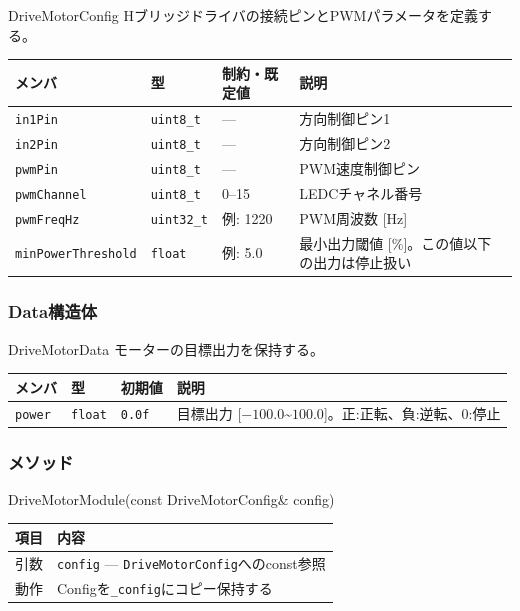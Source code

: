 \begin{funcblock}{DriveMotorConfig}
Hブリッジドライバの接続ピンとPWMパラメータを定義する。

\begin{longtable}{l l l p{4.2cm}}
\toprule
\textbf{メンバ} & \textbf{型} & \textbf{制約・既定値} & \textbf{説明} \\
\midrule
\endhead
\texttt{in1Pin}            & \texttt{uint8\_t}  & ---       & 方向制御ピン1 \\
\texttt{in2Pin}            & \texttt{uint8\_t}  & ---       & 方向制御ピン2 \\
\texttt{pwmPin}            & \texttt{uint8\_t}  & ---       & PWM速度制御ピン \\
\texttt{pwmChannel}        & \texttt{uint8\_t}  & 0--15     & LEDCチャネル番号 \\
\texttt{pwmFreqHz}         & \texttt{uint32\_t} & 例: 1220  & PWM周波数 [Hz] \\
\texttt{minPowerThreshold} & \texttt{float}     & 例: 5.0   & 最小出力閾値 [\%]。この値以下の出力は停止扱い \\
\bottomrule
\end{longtable}
\end{funcblock}

\subsubsection{Data構造体}

\begin{funcblock}{DriveMotorData}
モーターの目標出力を保持する。

\begin{longtable}{l l l p{5.0cm}}
\toprule
\textbf{メンバ} & \textbf{型} & \textbf{初期値} & \textbf{説明} \\
\midrule
\endhead
\texttt{power} & \texttt{float} & \texttt{0.0f} & 目標出力 [$-100.0$\textasciitilde$100.0$]。正:正転、負:逆転、0:停止 \\
\bottomrule
\end{longtable}
\end{funcblock}

\subsubsection{メソッド}

\begin{funcblock}{DriveMotorModule(const DriveMotorConfig\& config)}
\begin{tabularx}{\textwidth}{l X}
\toprule
\textbf{項目} & \textbf{内容} \\
\midrule
引数   & \texttt{config} --- \texttt{DriveMotorConfig}へのconst参照 \\
動作   & Configを\texttt{\_config}にコピー保持する \\
\bottomrule
\end{tabularx}
\end{funcblock}

